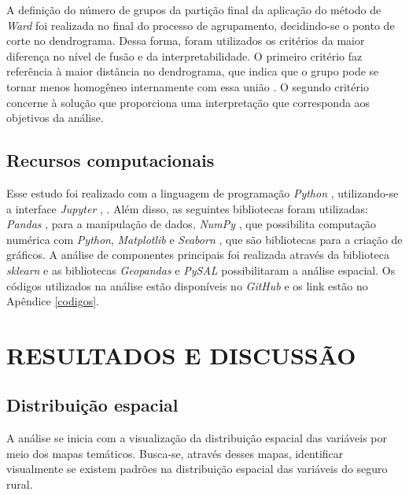 \documentclass[
	12pt,				%
	openright,			%
	oneside,			%
	a4paper,			%
	chapter=TITLE,		%
	section=TITLE,		%
	english,			%
	french,				%
	spanish,			%
	brazil				%
	]{abntex2}
\begin{document}
A definição do número de grupos da partição final da aplicação do método de \textit{Ward} foi realizada no final do processo de agrupamento, decidindo-se o ponto de corte no dendrograma. Dessa forma, foram utilizados os critérios da maior diferença no nível de fusão e da interpretabilidade. O primeiro critério faz referência à maior distância no dendrograma, que indica que o grupo pode se tornar menos homogêneo internamente com essa união \cite{everitt11}.  O segundo critério concerne à  solução que proporciona uma interpretação que corresponda aos objetivos da análise.  


\subsection{Recursos computacionais} 

Esse estudo foi realizado com a linguagem de programação \textit{Python} \cite{python17}, utilizando-se a interface \textit{Jupyter} \cite{jupyter17}, \cite{perez07} \cite{kluyver19}.
Além disso, as seguintes bibliotecas foram utilizadas: 
\textit{Pandas} \cite{mckinney10}, para a manipulação de dados,
\textit{NumPy} \cite{walt11}, que possibilita computação numérica com \textit{Python},
\textit{Matplotlib} \cite{hunter07} e \textit{Seaborn} \cite{waskom14}, que são bibliotecas para a criação de gráficos.
A análise de componentes principais foi realizada através da biblioteca \textit{sklearn} e as bibliotecas \textit{Geopandas} \cite{jordahl14} e \textit{PySAL} \cite{rey07} possibilitaram a análise espacial. Os códigos utilizados na análise estão disponíveis no \textit{GitHub} e os link estão no Apêndice \ref{codigos}. 

\section{\textbf{RESULTADOS E DISCUSSÃO}} 

\subsection{Distribuição espacial}

A análise se inicia com a visualização da distribuição espacial das variáveis por meio dos mapas temáticos. Busca-se, através desses mapas, identificar visualmente se existem padrões na distribuição espacial das variáveis do seguro rural.
\end{document}
